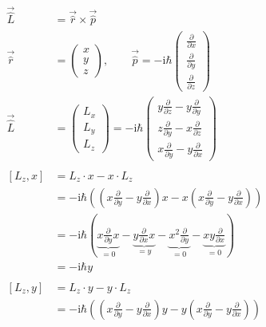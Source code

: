     \begin{align*}
        \vec{\hat{L}} &= \vec{\hat{r}} \times \vec{\hat{p}}\\
        \vec{\hat{r}} &= 
        \begin{pmatrix}
            x\\
            y\\
            z
        \end{pmatrix},
        \qquad \vec{\hat{p}} = -\text{i}\hbar
        \begin{pmatrix}
            \frac{\partial}{\partial x}\\
            \frac{\partial}{\partial y}\\
            \frac{\partial}{\partial z}
        \end{pmatrix}\\
        \vec{\hat{L}} &= 
        \begin{pmatrix}
            L_x\\
            L_y\\
            L_z
        \end{pmatrix}
        = 
        -\text{i}\hbar
        \begin{pmatrix}
            y\frac{\partial}{\partial z} - y\frac{\partial}{\partial y}\\
            z\frac{\partial}{\partial y} - x\frac{\partial}{\partial z}\\
            x\frac{\partial}{\partial y} - y\frac{\partial}{\partial x}
        \end{pmatrix}\\
        \\
        \left[ L_z,x \right] &= L_z\cdot x - x \cdot L_z\\
        &= -\text{i}\hbar \left( \left( x\frac{\partial}{\partial y} - y\frac{\partial}{\partial x} \right)x - x \left( x\frac{\partial}{\partial y} - y\frac{\partial}{\partial x} \right) \right)\\
        &= -\text{i}\hbar \left( \underbrace{x\frac{\partial}{\partial y}x}_{=0} - \underbrace{y\frac{\partial}{\partial x}x}_{=y} - \underbrace{x^2\frac{\partial}{\partial y}}_{=0} - \underbrace{xy\frac{\partial}{\partial x}}_{=0} \right)\\
        &= -\text{i}\hbar y\\
        \\
        \left[ L_z,y \right] &= L_z\cdot y - y \cdot L_z\\
        &= -\text{i}\hbar \left( \left( x\frac{\partial}{\partial y} - y\frac{\partial}{\partial x} \right)y - y\left( x\frac{\partial}{\partial y} - y\frac{\partial}{\partial x} \right) \right)\\

\end{align*}
